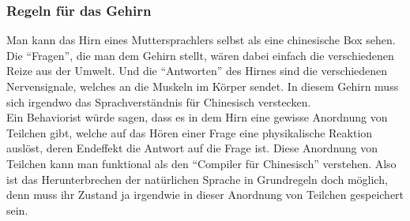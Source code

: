 \documentclass[a4paper,10pt]{article}
\begin{document}
\subsubsection{Regeln für das Gehirn}
Man kann das Hirn eines Muttersprachlers selbst als eine chinesische Box sehen. Die \enquote{Fragen}, die man dem Gehirn stellt, wären dabei einfach die verschiedenen Reize aus der Umwelt. Und die \enquote{Antworten} des Hirnes sind die verschiedenen Nervensignale, welches an die Muskeln im Körper sendet. In diesem Gehirn muss sich irgendwo das Sprachverständnis für Chinesisch verstecken. \\
Ein Behaviorist würde sagen, dass es in dem Hirn eine gewisse Anordnung von Teilchen gibt, welche auf das Hören einer Frage eine physikalische Reaktion auslöst, deren Endeffekt die Antwort auf die Frage ist. Diese Anordnung von Teilchen kann man funktional als den \enquote{Compiler für Chinesisch} verstehen. Also ist das Herunterbrechen der natürlichen Sprache in Grundregeln doch möglich, denn muss ihr Zustand ja irgendwie in dieser Anordnung von Teilchen gespeichert sein.
\end{document}
